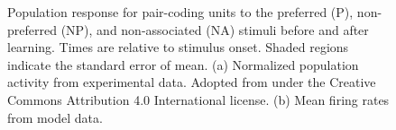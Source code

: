 \begin{figure}
    \centering

    \vspace*{.75cm}
    \caption[Population response for pair-coding units]{Population response for pair-coding units to the preferred (P), non-preferred (NP), and non-associated (NA) stimuli before and after learning. Times are relative to stimulus onset. Shaded regions indicate the standard error of mean. (a) Normalized population activity from experimental data. Adopted from \textcite{ison2015} under the Creative Commons Attribution 4.0 International license. (b) Mean firing rates from model data.}\label{fig:aml-population-response}
\end{figure}


